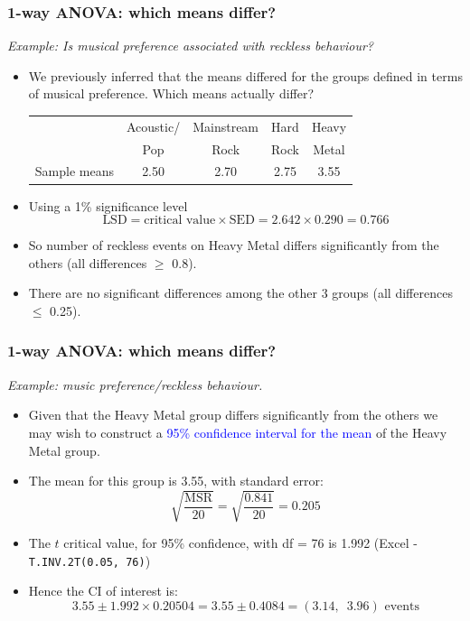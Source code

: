 \documentclass[12pt,xcolor=dvipsnames,handout,mathserif,aspectratio=169]{beamer}
\newcommand{\tc}{\textcolor}
\begin{document}
\begin{frame}
\frametitle{1-way ANOVA: which means differ?}
\emph{Example: Is musical preference associated with reckless behaviour?}
\begin{itemize}
\item We previously inferred that the means differed for the groups defined in terms of musical preference. Which means actually differ?
\vspace{0.3cm}
\begin{center}
{\small{
\begin{tabular}{ccccc}\hline
&Acoustic/& Mainstream& Hard &Heavy\\
&Pop& Rock &Rock &Metal\\ \hline
Sample means &2.50& 2.70 &2.75 &3.55\\ \hline
\end{tabular}}}
\end{center}
\vspace*{0.3cm}
\item Using a 1\% significance level
$$\mbox{LSD} =  \mbox{critical value} \times  \mbox{SED} = 2.642 \times 0.290 = 0.766 $$
\item So number of reckless events on Heavy Metal differs significantly from the others (all differences $\geq$ 0.8).
\vspace{0.3cm}
\item There are no significant differences among the other 3 groups (all differences $\leq$ 0.25).
\end{itemize}
\end{frame}

\begin{frame}\frametitle{1-way ANOVA: which means differ?}
\emph{Example: music preference/reckless behaviour.}
\begin{itemize}
\item Given that the Heavy Metal group differs significantly from the others we may wish to construct a \tc{blue}{95\% confidence interval for the mean} of the  Heavy Metal group.
\vspace*{0.3cm}
\item The mean for this group is 3.55, with standard error:
$$\sqrt{\frac{\mbox{MSR}}{20}} = \sqrt{\frac{0.841}{20}} =0.205$$
\vspace*{0.3cm}
\item The $t$ critical value, for 95\% confidence, with df = 76 is 1.992 (Excel - \texttt{T.INV.2T(0.05, 76)})
\vspace*{0.3cm}
\item Hence the CI of interest is:
$$ 3.55 \pm 1.992 \times 0.20504 = 3.55 \pm 0.4084 = (3.14, \,\,\,3.96) \mbox{ events}$$
\end{itemize}
\end{frame}
\end{document}
